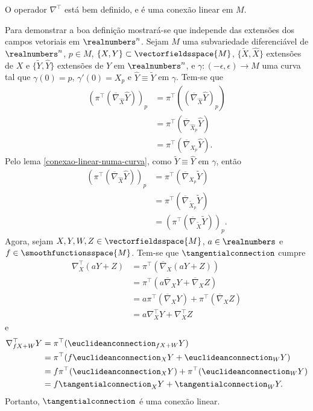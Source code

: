 \begin{lema}\label{boa-definicao-conexao-tangencial}
	O operador $\nabla^\top$ está bem definido, e é uma conexão linear em $M$.
\end{lema}

\begin{demonstracao}
	Para demonstrar a boa definição mostrará-se que independe das extensões dos campos vetoriais em $\realnumbers^n$.
	Sejam $M$ uma subvariedade diferenciável de $\realnumbers^n$, $p \in M$, $\{X,Y\} \subset \vectorfieldsspace{M}$, $\{ \tilde{X}, \hat{X} \}$ extensões de $X$ e $\{ \tilde{Y}, \hat{Y} \}$ extensões de $Y$ em $\realnumbers^n$, e $\gamma: (-\epsilon, \epsilon) \rightarrow M$ uma curva tal que $\gamma(0)=p$, $\gamma'(0)=X_p$ e $\hat{Y} \equiv \tilde{Y}$ em $\gamma$. Tem-se que
	\begin{align*}
		(\pi^\top (\overline{\nabla}_{\hat{X}} \hat{Y}))_p &= \pi^\top ((\overline{\nabla}_{\hat{X}} \hat{Y})_p)\\
		&= \pi^\top (\overline{\nabla}_{\hat{X}_p} \hat{Y})\\
		&= \pi^\top (\overline{\nabla}_{X_p} \hat{Y}).
	\end{align*}
	Pelo lema \ref{conexao-linear-numa-curva}, como $\tilde{Y} \equiv \hat{Y}$ em $\gamma$, então
	\begin{align*}
		(\pi^\top (\overline{\nabla}_{\hat{X}} \hat{Y}))_p &= \pi^\top (\overline{\nabla}_{X_p} \tilde{Y})\\
		&= \pi^\top (\overline{\nabla}_{\tilde{X}_p} \tilde{Y})\\
		&= (\pi^\top (\overline{\nabla}_{\tilde{X}} \tilde{Y}))_p.
	\end{align*}
	Agora, sejam $X,Y,W,Z \in \vectorfieldsspace{M}$, $a \in \realnumbers$ e $f \in \smoothfunctionsspace{M}$. Tem-se que $\tangentialconnection$ cumpre
	\begin{align*}
		\nabla^\top_X (aY + Z) &= \pi^\top (\overline{\nabla}_X (aY+Z))\\
		&= \pi^\top (a \overline{\nabla}_X Y + \overline{\nabla}_X Z)\\
		&= a \pi^\top (\overline{\nabla}_X Y) + \pi^\top (\overline{\nabla}_X Z)\\
		&= a \nabla^\top_X Y + \nabla^\top_X Z
	\end{align*}
	e
	\begin{align*}
		\nabla^\top_{fX + W} Y &= \pi^\top (\euclideanconnection_{fX + W} Y)\\
		&= \pi^\top (f \euclideanconnection_X Y + \euclideanconnection_W Y)\\
		&= f \pi^\top (\euclideanconnection_X Y) + \pi^\top (\euclideanconnection_W Y)\\
		&= f \tangentialconnection_X Y + \tangentialconnection_W Y.
	\end{align*}
	Portanto, $\tangentialconnection$ é uma conexão linear.
\end{demonstracao}

